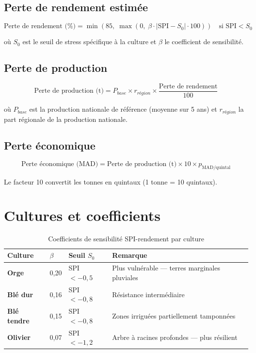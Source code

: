 \documentclass[12pt,a4paper]{report}
\begin{document}
\subsection{Perte de rendement estimée}

\begin{equation}
    \text{Perte de rendement (\%)} = \min\!\left(85,\; \max\!\left(0,\; \beta \cdot |\text{SPI} - S_0| \cdot 100\right)\right) \quad \text{si } \text{SPI} < S_0
\end{equation}

où $S_0$ est le seuil de stress spécifique à la culture et $\beta$ le coefficient de sensibilité.

\subsection{Perte de production}

\begin{equation}
    \text{Perte de production (t)} = P_{base} \times r_{région} \times \frac{\text{Perte de rendement}}{100}
\end{equation}

où $P_{base}$ est la production nationale de référence (moyenne sur 5 ans) et $r_{région}$ la part régionale de la production nationale.

\subsection{Perte économique}

\begin{equation}
    \text{Perte économique (MAD)} = \text{Perte de production (t)} \times 10 \times p_{\text{MAD/quintal}}
\end{equation}

Le facteur 10 convertit les tonnes en quintaux (1 tonne = 10 quintaux).

\section{Cultures et coefficients}

\begin{table}[H]
    \centering
    \begin{tabular}{>{\bfseries}p{3cm}p{2cm}p{3cm}p{5.5cm}}
        \toprule
        Culture & $\beta$ & Seuil $S_0$ & Remarque \\
        \midrule
        Orge & 0,20 & SPI $< -0{,}5$ & Plus vulnérable — terres marginales pluviales \\
        Blé dur & 0,16 & SPI $< -0{,}8$ & Résistance intermédiaire \\
        Blé tendre & 0,15 & SPI $< -0{,}8$ & Zones irriguées partiellement tamponnées \\
        Olivier & 0,07 & SPI $< -1{,}2$ & Arbre à racines profondes — plus résilient \\
        \bottomrule
    \end{tabular}
    \caption{Coefficients de sensibilité SPI-rendement par culture}
\end{table}
\end{document}
